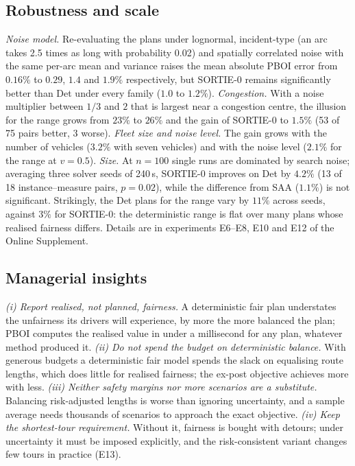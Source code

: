 \documentclass[11pt]{article}
\theoremstyle{definition}
\begin{document}
\begin{table}[t]\centering\small
\caption{Second benchmark family (twelve X instances, depot and first 50
customers), $B=1.10$, mean of two solver seeds: improvement of the ex-post value
over Det (format as Table~\ref{tab:e3}).}\label{tab:e17}

\end{table}

\subsection{Robustness and scale}\label{sec:exp:robust}
\emph{Noise model.} Re-evaluating the plans under lognormal, incident-type
(an arc takes 2.5 times as long with probability 0.02) and spatially
correlated noise with the same per-arc mean and variance raises the mean
absolute PBOI error from $0.16\%$ to $0.29$, $1.4$ and $1.9\%$ respectively,
but SORTIE-0 remains significantly better than Det under every family ($1.0$
to $1.2\%$). \emph{Congestion.} With a noise multiplier between $1/3$ and $2$
that is largest near a congestion centre, the illusion for the range grows
from $23\%$ to $26\%$ and the gain of SORTIE-0 to $1.5\%$ (53 of 75 pairs better,
3 worse). \emph{Fleet size and noise level.} The gain grows with the number of
vehicles ($3.2\%$ with seven vehicles) and with the noise level ($2.1\%$ for the
range at $v=0.5$). \emph{Size.} At $n=100$ single runs are dominated by search
noise; averaging three solver seeds of 240\,s, SORTIE-0 improves on Det by
$4.2\%$ (13 of 18 instance--measure pairs, $p=0.02$), while the difference from
SAA ($1.1\%$) is not significant. Strikingly, the Det plans for the range vary
by $11\%$ across seeds, against $3\%$ for SORTIE-0: the deterministic range is
flat over many plans whose realised fairness differs. Details are in
experiments E6--E8, E10 and E12 of the Online Supplement.

\subsection{Managerial insights}\label{sec:insights}
\emph{(i) Report realised, not planned, fairness.} A deterministic fair plan
understates the unfairness its drivers will experience, by more the more
balanced the plan; PBOI computes the realised value in under a millisecond for
any plan, whatever method produced it.
\emph{(ii) Do not spend the budget on deterministic balance.} With generous
budgets a deterministic fair model spends the slack on equalising route
lengths, which does little for realised fairness; the ex-post objective
achieves more with less.
\emph{(iii) Neither safety margins nor more scenarios are a substitute.}
Balancing risk-adjusted lengths is worse than ignoring uncertainty, and a
sample average needs thousands of scenarios to approach the exact objective.
\emph{(iv) Keep the shortest-tour requirement.} Without it, fairness is
bought with detours; under uncertainty it must be imposed explicitly, and the
risk-consistent variant changes few tours in practice (E13).
\end{document}
